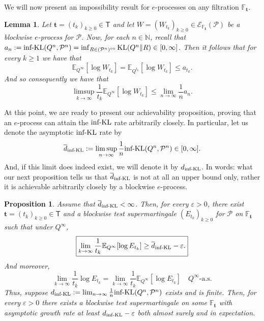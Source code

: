 \documentclass[11pt]{article}
\newcommand{\KL}{\mathrm{KL}}
\newcommand{\infKL}{\textnormal{inf-KL}}
\newcommand{\E}{\mathbb{E}}
\newcommand{\Pcal}{\mathcal{P}}
\newcommand{\bbF}{\mathbb F}
\newcommand{\bt}{\mathbf t}
\newcommand{\Tdet}{\mathsf T}
\newtheorem{proposition}[theorem]{Proposition}
\newtheorem{lemma}[theorem]{Lemma}
\theoremstyle{definition}
\theoremstyle{definition}
\begin{document}
We will now present an impossibility result for $e$-processes on any filtration $\bbF_{\bt}$.

\begin{lemma}\label{lem:eprocess-upper-by-infkl}
Let $\bt=(t_k)_{k\ge 0}\in\Tdet$ and let $W=(W_{t_k})_{k\ge 0}\in\mathcal E_{\bbF_{\bt}}(\Pcal)$ be a blockwise $e$-process for $\Pcal$. Now, for each $n\in\mathbb N$, recall that $a_n:=\infKL(Q^n,\Pcal^n)=\inf_{R\in(\Pcal^n)^{\circ\circ}}\KL(Q^n\|R)\in[0,\infty]$. Then it follows that for every $k\ge 1$ we have that
\[
\E_{Q^\infty}[\log W_{t_k}] =\E_{Q^{t_k}}[\log W_{t_k}]\le a_{t_k}.
\]
And so consequently we have that
\[
\limsup_{k\to\infty}\frac{1}{t_k}\E_{Q^\infty}[\log W_{t_k}]\le \lim_{n\to\infty}\frac{1}{n}a_n.
\]
\end{lemma}

At this point, we are ready to present our achievability proposition, proving that an $e$-process can attain the $\infKL$ rate arbitrarily closely. In particular, let us denote the asymptotic $\infKL$ rate by
\[
\overline d_{\infKL}:=\limsup_{n\to\infty}\frac{1}{n}\infKL(Q^n,\Pcal^n)\in[0,\infty].
\]
And, if this limit does indeed exist, we will denote it by $d_{\infKL}$. In words: what our next proposition tells us that $\overline d_{\infKL}$ is not at all an upper bound only, rather it is achievable arbitrarily closely by a blockwise $e$-process. 

\begin{proposition}\label{prop:achieve-infkl-rate}
Assume that $\overline d_{\infKL}<\infty$. Then, for every $\varepsilon>0$, there exist $\bt=(t_k)_{k\ge 0}\in\Tdet$ and a blockwise test supermartingale $(E_{t_k})_{k\ge 0}$ for $\Pcal$ on $\bbF_{\bt}$ such that under $Q^{\infty}$,
\[
\boxed{
\lim_{k\to\infty}\frac{1}{t_k}\E_{Q^\infty}[\log E_{t_k}]\ge \overline d_{\infKL}-\varepsilon.
}
\]
And moreover,
\[
\lim_{k\to\infty}\frac{1}{t_k}\log E_{t_k} = \lim_{k\to\infty}\frac{1}{t_k}\E_{Q^\infty}[\log E_{t_k}] \quad Q^\infty\text{-a.s.}
\]
Thus, suppose $d_{\infKL}:=\lim_{n\to\infty}\frac1n\infKL(Q^n,\Pcal^n)$ exists and is finite. Then, for every $\varepsilon>0$ there exists a blockwise test supermartingale on some $\bbF_{\bt}$ with asymptotic growth rate at least $d_{\infKL}-\varepsilon$ both almost surely and in expectation.
\end{proposition}
\end{document}
